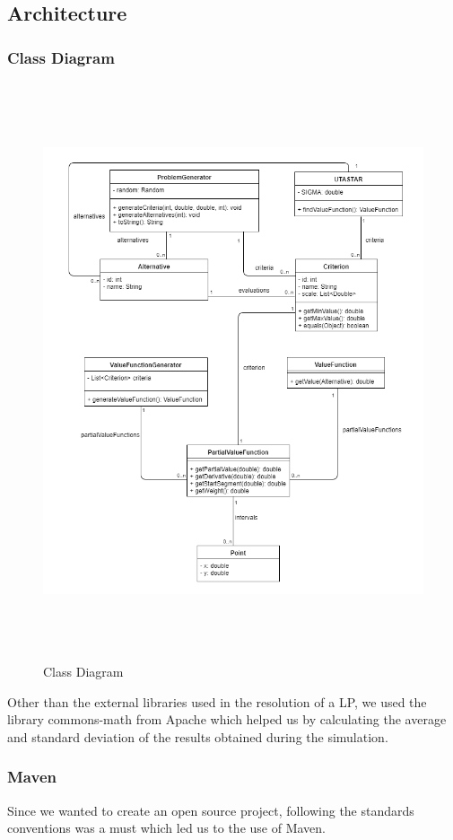 \documentclass{report}
\begin{document}
\subsection{Architecture}
\subsubsection{Class Diagram}
\begin{figure}[H]
\centering
\includegraphics[width=17cm,height=17cm,keepaspectratio]{diagram-uml.png}
\caption{Class Diagram}
\end{figure}
Other than the external libraries used in the resolution of a LP, we used the library commons-math from Apache which helped us by calculating the average and standard deviation of the results obtained during the simulation. \\

\subsubsection{Maven}
Since we wanted to create an open source project, following the standards conventions was a must which led us to the use of Maven. \\
\end{document}
